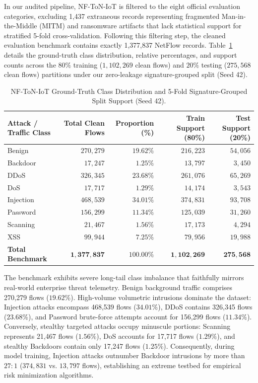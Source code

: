 \documentclass[12pt,a4paper]{report}
\begin{document}
In our audited pipeline, NF-ToN-IoT is filtered to the eight official evaluation categories, excluding 1,437 extraneous records representing fragmented Man-in-the-Middle (MITM) and ransomware artifacts that lack statistical support for stratified 5-fold cross-validation. Following this filtering step, the cleaned evaluation benchmark contains exactly 1,377,837 NetFlow records. Table~\ref{tab:dataset_distribution} details the ground-truth class distribution, relative percentages, and support counts across the $80\%$ training ($1,102,269$ clean flows) and $20\%$ testing ($275,568$ clean flows) partitions under our zero-leakage signature-grouped split (Seed 42).

\begin{table}[H]
\centering
\caption{NF-ToN-IoT Ground-Truth Class Distribution and 5-Fold Signature-Grouped Split Support (Seed 42).}
\label{tab:dataset_distribution}
\small
\begin{tabularx}{\textwidth}{Xrrrr}
\toprule
\textbf{Attack / Traffic Class} & \textbf{Total Clean Flows} & \textbf{Proportion (\%)} & \textbf{Train Support (80\%)} & \textbf{Test Support (20\%)} \\
\midrule
Benign & $270,279$ & $19.62\%$ & $216,223$ & $54,056$ \\
Backdoor & $17,247$ & $1.25\%$ & $13,797$ & $3,450$ \\
DDoS & $326,345$ & $23.68\%$ & $261,076$ & $65,269$ \\
DoS & $17,717$ & $1.29\%$ & $14,174$ & $3,543$ \\
Injection & $468,539$ & $34.01\%$ & $374,831$ & $93,708$ \\
Password & $156,299$ & $11.34\%$ & $125,039$ & $31,260$ \\
Scanning & $21,467$ & $1.56\%$ & $17,173$ & $4,294$ \\
XSS & $99,944$ & $7.25\%$ & $79,956$ & $19,988$ \\
\midrule
\textbf{Total Benchmark} & $\mathbf{1,377,837}$ & $\mathbf{100.00\%}$ & $\mathbf{1,102,269}$ & $\mathbf{275,568}$ \\
\bottomrule
\end{tabularx}
\end{table}

The benchmark exhibits severe long-tail class imbalance that faithfully mirrors real-world enterprise threat telemetry. Benign background traffic comprises 270,279 flows ($19.62\%$). High-volume volumetric intrusions dominate the dataset: Injection attacks encompass 468,539 flows ($34.01\%$), DDoS contains 326,345 flows ($23.68\%$), and Password brute-force attempts account for 156,299 flows ($11.34\%$). Conversely, stealthy targeted attacks occupy minuscule portions: Scanning represents 21,467 flows ($1.56\%$), DoS accounts for 17,717 flows ($1.29\%$), and stealthy Backdoors contain only 17,247 flows ($1.25\%$). Consequently, during model training, Injection attacks outnumber Backdoor intrusions by more than $27:1$ ($374,831$ vs. $13,797$ flows), establishing an extreme testbed for empirical risk minimization algorithms.
\end{document}
